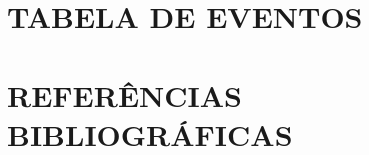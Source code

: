 \documentclass[12pt]{iptex}
\renewcommand{\refname}{REFERÊNCIAS}
\renewcommand{\refname}{REFERENCES}
\begin{document}






\section{TABELA DE EVENTOS}
\label{sec:tabelas}

\newpage


\newpage

\section{REFERÊNCIAS BIBLIOGRÁFICAS}
\renewcommand{\refname}{REFERÊNCIAS}

\end{document}
